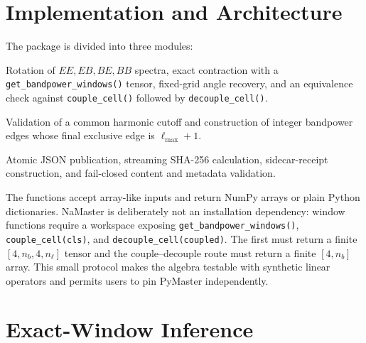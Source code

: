 \documentclass[11pt]{article}
\begin{document}
\section{Implementation and Architecture}

The package is divided into three modules:

\begin{description}[leftmargin=2.8cm,style=nextline]
\item[\texttt{windows}]
  Rotation of \(EE,EB,BE,BB\) spectra, exact contraction with a
  \nolinkurl{get_bandpower_windows()} tensor, fixed-grid angle recovery, and
  an equivalence check against \nolinkurl{couple_cell()} followed by
  \nolinkurl{decouple_cell()}.
\item[Multipoles]
  Validation of a common harmonic cutoff and construction of integer
  bandpower edges whose final exclusive edge is \(\ell_{\max}+1\).
\item[\texttt{receipts}]
  Atomic JSON publication, streaming SHA-256 calculation, sidecar-receipt
  construction, and fail-closed content and metadata validation.
\end{description}

The functions accept array-like inputs and return NumPy arrays or plain Python
dictionaries.  NaMaster is deliberately not an installation dependency:
window functions require a workspace exposing
\nolinkurl{get_bandpower_windows()}, \nolinkurl{couple_cell(cls)}, and
\nolinkurl{decouple_cell(coupled)}. The first must return a finite
\([4,n_b,4,n_\ell]\) tensor and the couple--decouple route must return a finite
\([4,n_b]\) array. This small protocol makes the algebra testable with synthetic
linear operators and permits users to pin PyMaster independently.

\section{Exact-Window Inference}
\end{document}
